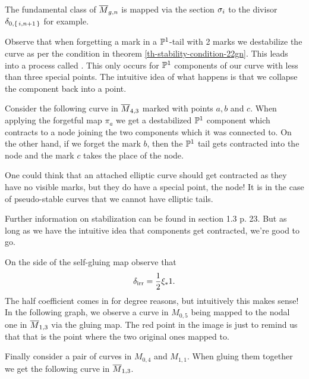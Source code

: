 \documentclass[12pt]{memoir}
\begin{document}
\begin{Ex}
    The fundamental class of $\overline M_{g,n}$ is mapped via the section $\sigma_i$ to the divisor $\delta_{0,\{\,i,n+1\,\}}$ for example.  
\end{Ex}

\begin{Rmk}
    Observe that when forgetting a mark in a $\mathbb{P}^1$-tail with 2 marks we destabilize the curve as per the condition in theorem \ref{th-stability-condition-22gn}. This leads into a process called . This only occurs for $\mathbb{P}^1$ components of our curve with less than three special points. The intuitive idea of what happens is that we collapse the component back into a point.
\end{Rmk}

\begin{Ex}
Consider the following curve in $\overline M_{4,3}$ marked with points $a,b$ and $c$.  When applying the forgetful map $\pi_a$ we get a destabilized $\mathbb{P}^1$ component which contracts to a node joining the two components which it was connected to.
On the other hand, if we forget the mark $b$, then the $\mathbb{P}^1$ tail gets contracted into the node and the mark $c$ takes the place of the node. 
\end{Ex}

\begin{Rmk}
    One could think that an attached elliptic curve should get contracted as they have no visible marks, but they do have a special point, the node! It is in the case of pseudo-stable curves that we cannot have elliptic tails.
\end{Rmk}

Further information on stabilization can be found in \cite{GreenBookKockVainsencher} section 1.3 p. 23. But as long as we have the intuitive idea that components get contracted, we're good to go.

\begin{Ex}
    On the side of the self-gluing map observe that 
    $$\dl_{\text{irr}}=\half\xi_\ast 1.$$
    The half coefficient comes in for degree reasons, but intuitively this makes sense! In the following graph, we observe a curve in $M_{0,5}$ being mapped to the nodal one in $\overline M_{1,3}$ via the gluing map.  The red point in the image is just to remind us that that is the point where the two original ones mapped to.
\end{Ex}

\begin{Ex}
    Finally consider a pair of curves in $M_{0,4}$ and $M_{1,1}$. When gluing them together we get the following curve in $\overline M_{1,3}$. 
\end{Ex}
\end{document}
